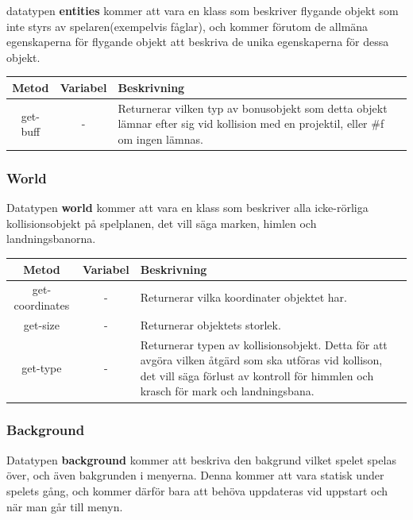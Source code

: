 \documentclass[12pt,a4paper]{article}
\newcounter{subsubsubsection}[subsubsection]
\begin{document}
datatypen \textbf{entities} kommer att vara en klass som beskriver flygande objekt som inte styrs av spelaren(exempelvis fåglar), och kommer förutom de allmäna egenskaperna för flygande objekt att beskriva de unika egenskaperna för dessa objekt. \\

\begin{tabular}{| c | c | p{9.5cm} |}
	\hline
	\textbf{Metod} & \textbf{Variabel} & \textbf{Beskrivning} \\
	\hline
	
	get-buff & - & Returnerar vilken typ av bonusobjekt som detta objekt lämnar efter sig vid kollision med en projektil, eller \#f om ingen lämnas.\\
	\hline
	
\end{tabular}

\subsubsection{World}
Datatypen \textbf{world} kommer att vara en klass som beskriver alla icke-rörliga kollisionsobjekt på spelplanen, det vill säga marken, himlen och landningsbanorna. \\

\begin{tabular}{| c | c | p{8cm} |}
	\hline
	\textbf{Metod} & \textbf{Variabel} & \textbf{Beskrivning} \\
	\hline
	
	get-coordinates & - & Returnerar vilka koordinater objektet har. \\
	\hline
	get-size & - & Returnerar objektets storlek. \\
	\hline
	get-type & - & Returnerar typen av kollisionsobjekt. Detta för att avgöra vilken åtgärd som ska utföras vid kollison, det vill säga förlust av kontroll för himmlen och krasch för mark och landningsbana. \\
	\hline
\end{tabular}

\subsubsection{Background}
Datatypen \textbf{background} kommer att beskriva den bakgrund vilket spelet spelas över, och även bakgrunden i menyerna. Denna kommer att vara statisk under spelets gång, och kommer därför bara att behöva uppdateras vid uppstart och när man går till menyn.
\end{document}
